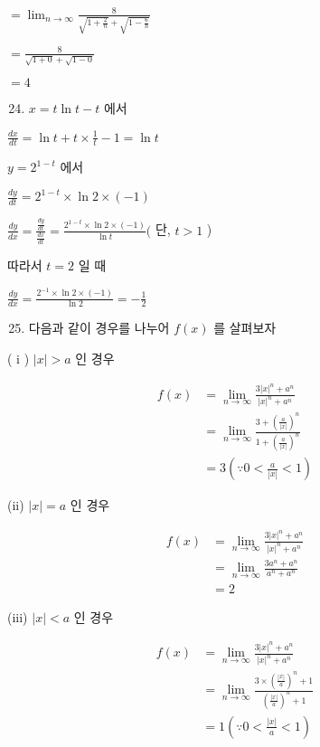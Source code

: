 \documentclass[10pt]{article}
\begin{document}
$=\lim _{n \rightarrow \infty} \frac{8}{\sqrt{1+\frac{2}{n}}+\sqrt{1-\frac{6}{n}}}$

$=\frac{8}{\sqrt{1+0}+\sqrt{1-0}}$

$=4$

\begin{enumerate}
  \setcounter{enumi}{23}
  \item $x=t \ln t-t$ 에서
\end{enumerate}

$\frac{d x}{d t}=\ln t+t \times \frac{1}{t}-1=\ln t$

$y=2^{1-t}$ 에서

$\frac{d y}{d t}=2^{1-t} \times \ln 2 \times(-1)$

$\frac{d y}{d x}=\frac{\frac{d y}{d t}}{\frac{d x}{d t}}=\frac{2^{1-t} \times \ln 2 \times(-1)}{\ln t}($ 단, $t>1$ )

따라서 $t=2$ 일 때

$\frac{d y}{d x}=\frac{2^{-1} \times \ln 2 \times(-1)}{\ln 2}=-\frac{1}{2}$

\begin{enumerate}
  \setcounter{enumi}{24}
  \item 다음과 같이 경우를 나누어 $f(x)$ 를 살펴보자
\end{enumerate}

( i ) $|x|>a$ 인 경우

\[
\begin{aligned}
f(x) & =\lim _{n \rightarrow \infty} \frac{3|x|^{n}+a^{n}}{|x|^{n}+a^{n}} \\
& =\lim _{n \rightarrow \infty} \frac{3+\left(\frac{a}{|x|}\right)^{n}}{1+\left(\frac{a}{|x|}\right)^{n}} \\
& =3\left(\because 0<\frac{a}{|x|}<1\right)
\end{aligned}
\]

(ii) $|x|=a$ 인 경우

\[
\begin{aligned}
f(x) & =\lim _{n \rightarrow \infty} \frac{3|x|^{n}+a^{n}}{|x|^{n}+a^{n}} \\
& =\lim _{n \rightarrow \infty} \frac{3 a^{n}+a^{n}}{a^{n}+a^{n}} \\
& =2
\end{aligned}
\]

(iii) $|x|<a$ 인 경우

\[
\begin{aligned}
f(x) & =\lim _{n \rightarrow \infty} \frac{3|x|^{n}+a^{n}}{|x|^{n}+a^{n}} \\
& =\lim _{n \rightarrow \infty} \frac{3 \times\left(\frac{|x|}{a}\right)^{n}+1}{\left(\frac{|x|}{a}\right)^{n}+1} \\
& =1\left(\because 0<\frac{|x|}{a}<1\right)
\end{aligned}
\]
\end{document}
